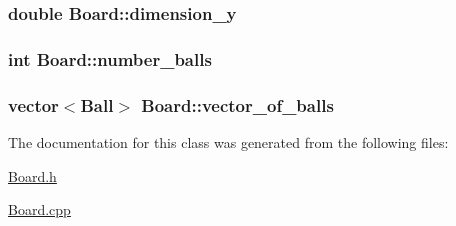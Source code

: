 \hypertarget{classBoard_a7133e5c99e2ed0b9ec6d28c8ec8d783d}{
\subsubsection[{dimension\+\_\+y}]{\setlength{\rightskip}{0pt plus 5cm}double Board\+::dimension\+\_\+y\hspace{0.3cm}{\ttfamily [private]}}}\label{classBoard_a7133e5c99e2ed0b9ec6d28c8ec8d783d}
\hypertarget{classBoard_a3f5f80a78c7925c8e33d8e08d4799b9d}{
\subsubsection[{number\+\_\+balls}]{\setlength{\rightskip}{0pt plus 5cm}int Board\+::number\+\_\+balls\hspace{0.3cm}{\ttfamily [private]}}}\label{classBoard_a3f5f80a78c7925c8e33d8e08d4799b9d}
\hypertarget{classBoard_a2f3f6dcb96ea6cd77d7c6b3305f8a5d3}{
\subsubsection[{vector\+\_\+of\+\_\+balls}]{\setlength{\rightskip}{0pt plus 5cm}vector$<${\bf Ball}$>$ Board\+::vector\+\_\+of\+\_\+balls\hspace{0.3cm}{\ttfamily [private]}}}\label{classBoard_a2f3f6dcb96ea6cd77d7c6b3305f8a5d3}


The documentation for this class was generated from the following files\+:\begin{DoxyCompactItemize}
\item 
\hyperlink{Board_8h}{Board.\+h}\item 
\hyperlink{Board_8cpp}{Board.\+cpp}\end{DoxyCompactItemize}
